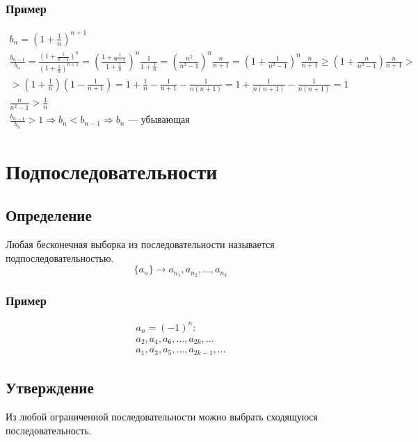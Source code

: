 \documentclass{article}
\begin{document}
\subsubsection{Пример}
\begin{gather*}
    b_n = \left(1 + \frac{1}{n}\right)^{n + 1} \\
    \frac{b_{n-1}}{b_n} = 
    \frac{\left(1 + \frac{1}{n - 1}\right)^n}{\left(1 + \frac{1}{n}\right)^{n + 1}} = 
    \left(\frac{1 + \frac{1}{n - 1}}{1 + \frac{1}{n}}\right)^n \frac{1}{1 + \frac{1}{n}} = 
    \left(\frac{n^2}{n^2 - 1}\right)^n \frac{n}{n + 1} = 
    \left(1 + \frac{1}{n^2 - 1}\right)^n \frac{n}{n + 1} \ge 
    \left(1 + \frac{n}{n^2 - 1}\right) \frac{n}{n + 1} > \\
    > \left(1 + \frac{1}{n}\right) \left(1 - \frac{1}{n + 1}\right) =
    1 + \frac{1}{n} - \frac{1}{n + 1} - \frac{1}{n(n + 1)} =
    1 + \frac{1}{n(n + 1)} - \frac{1}{n(n + 1)} = 1 \\
    \frac{n}{n^2 - 1} > \frac{1}{n} \\
    \frac{b_{n - 1}}{b_n} > 1 \Rightarrow b_n < b_{n - 1} \Rightarrow b_n \text{ --- убывающая}
\end{gather*}

\section{Подпоследовательности}

\subsection{Определение}
Любая бесконечная выборка из последовательности называется подпоследовательностью.
\[
    \{a_n\} \rightarrow a_{n_1}, a_{n_2}, \dots, a_{n_k}
\]

\subsubsection{Пример}
\begin{gather*}
    a_n = (-1)^n: \\
    a_2, a_4, a_6,\dots, a_{2k}, \dots \\
    a_1, a_3, a_5,\dots, a_{2k - 1}, \dots
\end{gather*}

\subsection{Утверждение}
Из любой ограниченной последовательности можно выбрать сходящуюся последовательность.
\end{document}
